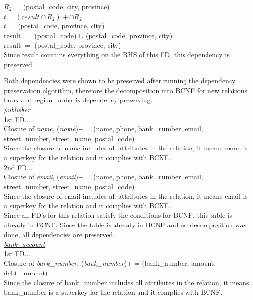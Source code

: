 \documentclass[a4 paper]{article}
\begin{document}
\begin{enumerate}
	$R_{2} =$ (postal\_code, city, province)\\
	$t = (result \cap R_{2})+ \cap R_{2}$\\
	$t =$ (postal\_code, province, city)\\
	result $=$ (postal\_code) $\cup$ (postal\_code, province, city)\\
	result $=$ (postal\_code, province, city)\\
	
	Since result contains everything on the RHS of this FD, this dependency is preserved.

\end{enumerate}

\noindent Both dependencies were shown to be preserved after running the dependency preservation algorithm, therefore the decomposition into BCNF for new relations book and region\_order is dependency preserving.\\

\noindent\underline{\emph{publisher}}\\

\noindent 1st FD...\\
\indent Closure of \emph{name}, (\emph{name})+ = (name, phone, bank\_number, email, street\_number, street\_name, postal\_code)\\
\indent Since the closure of name includes all attributes in the relation, it means name is a superkey for the relation and it complies with BCNF.\\

\noindent 2nd FD...\\
\indent Closure of \emph{email}, (\emph{email})+ = (name, phone, bank\_number, email, street\_number, street\_name, postal\_code)\\
\indent Since the closure of email includes all attributes in the relation, it means email is a superkey for the relation and it complies with BCNF.\\

\noindent Since all FD's for this relation satisfy the conditions for BCNF, this table is already in BCNF. Since the table is already in BCNF and no decomposition was done, all dependencies are preserved.\\

\noindent\underline{\emph{bank\_account}}\\

\noindent 1st FD...\\
\indent Closure of \emph{bank\_number}, (\emph{bank\_number})+ = (bank\_number, amount, debt\_amount)\\
\indent Since the closure of bank\_number includes all attributes in the relation, it means bank\_number is a superkey for the relation and it complies with BCNF.\\
\end{document}
